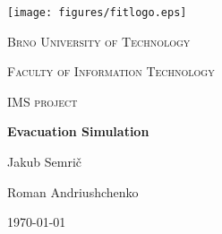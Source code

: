 \documentclass[english]{report}
\begin{document}
\begin{titlepage}
\centering
\texttt{[image: figures/fitlogo.eps]}\par\vspace{1cm}
{\scshape\LARGE Brno University of Technology\par}
\vspace{0.25cm}
{\scshape\LARGE Faculty of Information Technology\par}
\vspace{1cm}
{\scshape\Large IMS project\par}
\vspace{1.5cm}
{\Huge\bfseries Evacuation Simulation\par}
\vspace{2cm}
{\Large Jakub Semrič\par}
{\Large Roman Andriushchenko\par}
\vfill
{\large\today\par}
\end{titlepage}

\tableofcontents



\makeatletter
\def\@openbib@code{\addcontentsline{toc}{chapter}{Bibliography}}
\makeatother





\end{document}
